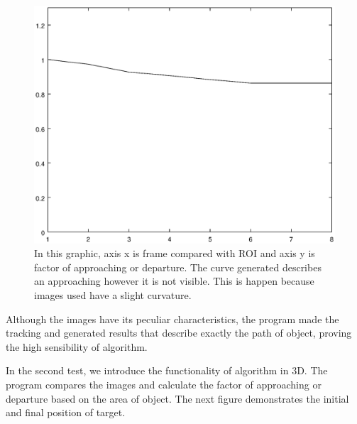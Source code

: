 \begin{figure}[H]
\includegraphics[width=\columnwidth]{images/graph1.eps}
\caption{In this graphic, axis x is frame compared with ROI and axis 
y is factor of approaching or departure.
The curve generated describes an approaching however it is not visible. 
This is happen because images used have a slight curvature.}
\label{fig:res_graph1}
\end{figure}

Although the images have its peculiar characteristics, the program made 
the tracking and generated results that describe exactly the path of 
object, proving the high sensibility of algorithm.

In the second test, we introduce the functionality of algorithm in 3D. 
The program compares the images and calculate the factor of approaching or 
departure based on the area of object. The next figure demonstrates the 
initial and final position of target.

